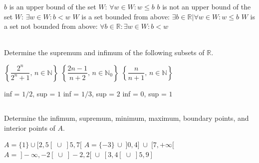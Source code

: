 \begin{Answer}\phantom{}

    \Question $b$ is an upper bound of the set $W$: \quad $\forall w \in W: w \leq b$
    \Question $b$ is not an upper bound of the set $W$: \quad $\exists w \in W: b < w$
    \Question $W$  is a set bounded from above: \quad $\exists b \in \mathbb{R} | \forall w \in W: w \leq b$
    \Question $W$ is a set not bounded from above: \quad $\forall b \in \mathbb{R} : \exists w \in W: b < w$
\end{Answer}
		
\begin{Exercise} \\Determine the supremum and infimum of the following subsets of $\mathbb{R}$. 
    \begin{multicols}{3}
		\Question[difficulty = 1] $\left\{ \dfrac{2^n}{2^n+1}, \, n \in \mathbb{N}  \right\}$
		\Question[difficulty = 1] $\left\{ \dfrac{2n-1}{n+2}, \, n \in \mathbb{N}_0  \right\}$
		\Question[difficulty = 1] $\left\{ \dfrac{n}{n+1}, \, n \in \mathbb{N}  \right\}$
		\EndCurrentQuestion
	\end{multicols}
\end{Exercise}

\begin{Answer}\phantom{}
    \begin{multicols}{2}

    \Question inf = $1/2$, sup = $1$
    \Question inf = $1/3$, sup = $2$
    \Question inf = $0$, sup = $1$
    \EndCurrentQuestion
    \end{multicols}
\end{Answer}
		
\subsection*{}		
		
\begin{Exercise} Determine the infimum, supremum, minimum, maximum, boundary points, and interior points of $A$. 
    \begin{multicols}{2}
		\Question[difficulty = 1] $A = \{1\} \cup [2,5[ \; \cup \; ]5,7[$
		\Question[difficulty = 1] $A = \{-3\}\, \cup\; ]0,4] \; \cup \; [7,+\infty[$
		\Question[difficulty = 1] $A =\; ]-\infty,-2[ \; \cup \; ]-2,2[ \; \cup \; [3,4[ \; \cup \; ]5,9]$
		\EndCurrentQuestion
	\end{multicols}
\end{Exercise}

